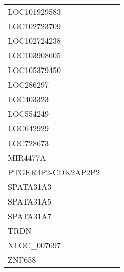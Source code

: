 \begin{tabular}{lcc}
LOC101929583       &                &            \\
LOC102723709       &                &            \\
LOC102724238       &                &            \\
LOC103908605       &                &            \\
LOC105379450       &                &            \\
LOC286297          &                &            \\
LOC403323          &                &            \\
LOC554249          &                &            \\
LOC642929          &                &            \\
LOC728673          &                &            \\
MIR4477A           &                &            \\
PTGER4P2-CDK2AP2P2 &                &            \\
SPATA31A3          &                &            \\
SPATA31A5          &                &            \\
SPATA31A7          &                &            \\
TRDN               &                &            \\
XLOC\_007697        &                &            \\
ZNF658             &                &            \\
\bottomrule
\end{tabular}
